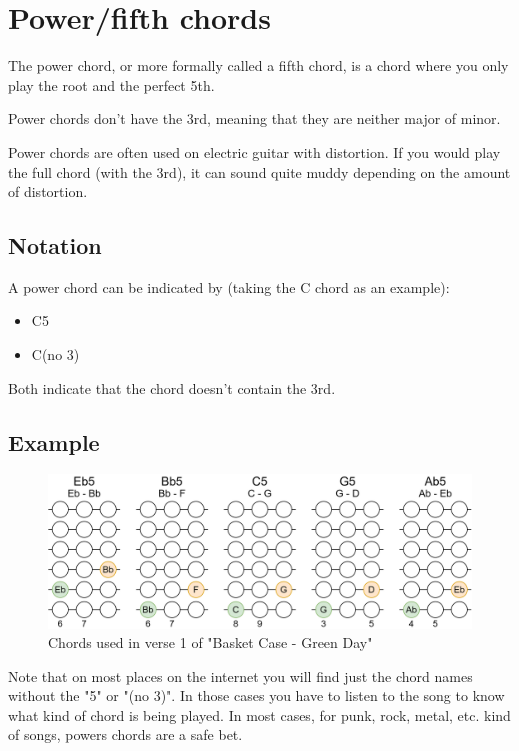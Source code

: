 \section{Power/fifth chords}

The power chord, or more formally called a fifth chord, is a chord where you only play the root and the perfect 5th.

Power chords don't have the 3rd, meaning that they are neither major of minor.

Power chords are often used on electric guitar with distortion. If you would play the full chord (with the 3rd), it can sound quite muddy depending on the amount of distortion.


\subsection{Notation}
A power chord can be indicated by (taking the C chord as an example):

\begin{itemize}
	\item C5
	\item C(no 3)
\end{itemize}

Both indicate that the chord doesn't contain the 3rd.

\subsection{Example}

\begin{figure}[h]
	\centering
	\includegraphics[height=0.16\textheight]{../../Images/ChordsUsedInBasketCaseGreenDayVerse1.png}
	\caption{Chords used in verse 1 of "Basket Case - Green Day"}
	\label{fig:guitar_chords_verse_1_basket_case_green_day}
\end{figure}

Note that on most places on the internet you will find just the chord names without the "5" or "(no 3)". In those cases you have to listen to the song to know what kind of chord is being played. In most cases, for punk, rock, metal, etc. kind of songs, powers chords are a safe bet.

